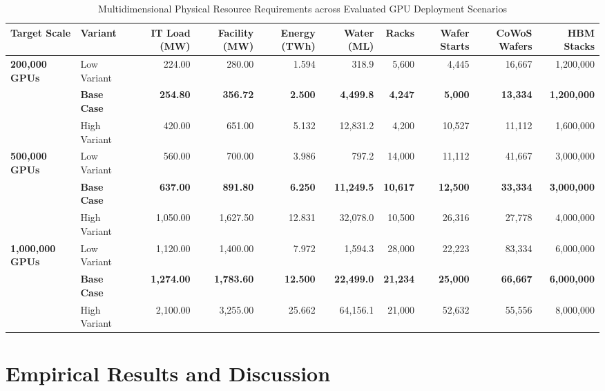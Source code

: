 \documentclass[conference]{IEEEtran}
\begin{document}
\begin{table}[t]
\caption{Multidimensional Physical Resource Requirements across Evaluated GPU Deployment Scenarios}
\label{tab:scenario_results}
\centering
\scriptsize
\begin{tabular*}{\textwidth}{@{\extracolsep{\fill}}llrrrrrrrr@{}}
\toprule
\textbf{Target Scale} & \textbf{Variant} & \textbf{IT Load (MW)} & \textbf{Facility (MW)} & \textbf{Energy (TWh)} & \textbf{Water (ML)} & \textbf{Racks} & \textbf{Wafer Starts} & \textbf{CoWoS Wafers} & \textbf{HBM Stacks} \\
\midrule
\multirow{3}{*}{\textbf{200,000 GPUs}} 
& Low Variant  & 224.00 & 280.00 & 1.594 & 318.9 & 5,600 & 4,445 & 16,667 & 1,200,000 \\
& \textbf{Base Case} & \textbf{254.80} & \textbf{356.72} & \textbf{2.500} & \textbf{4,499.8} & \textbf{4,247} & \textbf{5,000} & \textbf{13,334} & \textbf{1,200,000} \\
& High Variant & 420.00 & 651.00 & 5.132 & 12,831.2 & 4,200 & 10,527 & 11,112 & 1,600,000 \\
\midrule
\multirow{3}{*}{\textbf{500,000 GPUs}} 
& Low Variant  & 560.00 & 700.00 & 3.986 & 797.2 & 14,000 & 11,112 & 41,667 & 3,000,000 \\
& \textbf{Base Case} & \textbf{637.00} & \textbf{891.80} & \textbf{6.250} & \textbf{11,249.5} & \textbf{10,617} & \textbf{12,500} & \textbf{33,334} & \textbf{3,000,000} \\
& High Variant & 1,050.00 & 1,627.50 & 12.831 & 32,078.0 & 10,500 & 26,316 & 27,778 & 4,000,000 \\
\midrule
\multirow{3}{*}{\textbf{1,000,000 GPUs}} 
& Low Variant  & 1,120.00 & 1,400.00 & 7.972 & 1,594.3 & 28,000 & 22,223 & 83,334 & 6,000,000 \\
& \textbf{Base Case} & \textbf{1,274.00} & \textbf{1,783.60} & \textbf{12.500} & \textbf{22,499.0} & \textbf{21,234} & \textbf{25,000} & \textbf{66,667} & \textbf{6,000,000} \\
& High Variant & 2,100.00 & 3,255.00 & 25.662 & 64,156.1 & 21,000 & 52,632 & 55,556 & 8,000,000 \\
\bottomrule
\end{tabular*}
\end{table}

\section{Empirical Results and Discussion}
\end{document}
